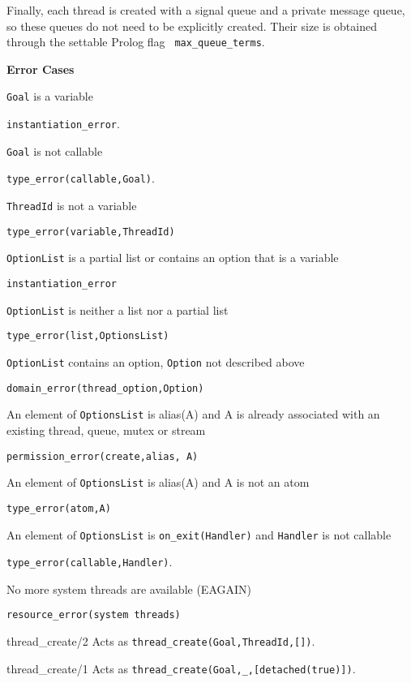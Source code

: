 \begin{description}
Finally, each thread is created with a signal queue and a private
message queue, so these queues do not need to be explicitly created.
Their size is obtained through the settable Prolog flag {\tt
  max\_queue\_terms}.

{\bf Error Cases}
\bi
\item 	{\tt Goal} is a variable
\bi
\item 	{\tt instantiation\_error}.
\ei
\item 	{\tt Goal} is not callable
\bi
\item 	{\tt type\_error(callable,Goal)}.
\ei
\item 	{\tt ThreadId} is not a variable
\bi
\item 	{\tt type\_error(variable,ThreadId)}
\ei
\item 	{\tt OptionList} is a partial list or contains an option that is a variable
\bi
\item 	{\tt instantiation\_error}
\ei
\item 	{\tt OptionList} is neither a list nor a partial list
\bi
\item 	{\tt type\_error(list,OptionsList)}
\ei
\item 	{\tt OptionList} contains an option, {\tt Option} not described above
\bi
\item 	{\tt domain\_error(thread\_option,Option)}
\ei
\item An element of {\tt OptionsList} is alias(A) and A is already
  associated with an existing thread, queue, mutex or stream 
\bi
\item {\tt permission\_error(create,alias, A)}
\ei
\item An element of {\tt OptionsList} is alias(A) and A is not an atom
\bi
\item {\tt type\_error(atom,A)}
\ei
\item An element of {\tt OptionsList} is {\tt on\_exit(Handler)} and
      {\tt Handler} is not callable 
\bi
\item 	{\tt type\_error(callable,Handler)}.
\ei
\item   No more system threads are available (EAGAIN)
\bi
\item {\tt resource\_error(system threads)}
\ei
\ei

{thread\_create/2}
%
Acts as {\tt thread\_create(Goal,ThreadId,[])}.

{thread\_create/1}
%
Acts as {\tt thread\_create(Goal,\_,[detached(true)])}.


\end{description}

